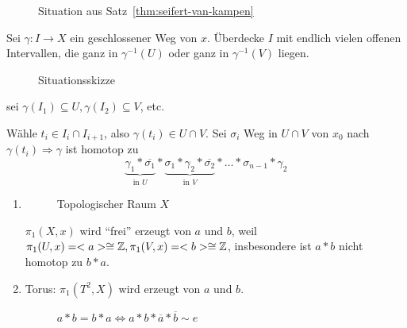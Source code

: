 \begin{figure}
    \centering
    
    \caption{Situation aus Satz~\ref{thm:seifert-van-kampen}}
    \label{fig:satz-seifert-van-kampen}
\end{figure}

\begin{beweis}
    Sei $\gamma: I \rightarrow X$ ein geschlossener Weg von $x$.
    Überdecke $I$ mit endlich vielen offenen Intervallen, die ganz in 
    $\gamma^{-1}(U)$ oder ganz in $\gamma^{-1}(V)$ liegen.

    \begin{figure}
        \centering
        
        \caption{Situationsskizze}
        \label{fig:intervalle-auf-01}
    \end{figure}

    \Obda sei $\gamma(I_1) \subseteq U, \gamma(I_2) \subseteq V$, etc.

    Wähle $t_i \in I_i \cap I_{i+1}$, also $\gamma(t_i) \in U \cap V$.
    Sei $\sigma_i$ Weg in $U \cap V$ von $x_0$ nach $\gamma(t_i) \Rightarrow \gamma$
    ist homotop zu 
    \[\underbrace{\gamma_1 * \overline{\sigma_1}}_{\text{in } U} * \underbrace{\sigma_1 * \gamma_2 * \overline{\sigma_2}}_{\text{in } V} * \dots * \sigma_{n-1} * \gamma_2\]
\end{beweis}

\begin{beispiel}
    \begin{enumerate}[label=\arabic*)]
        \item
            \begin{figure}
                \centering
                
                \caption{Topologischer Raum $X$}
                \label{fig:top-raum-kreise}
            \end{figure}

            $\pi_1(X,x)$ wird \enquote{frei} erzeugt von $a$ und $b$, weil
            $\pi_1(U,x) = <a> \cong \mathbb{Z}, \pi_1(V,x) = <b> \cong \mathbb{Z}$,
            insbesondere ist $a*b$ nicht homotop zu $b*a$.
        \item Torus: $\pi_1(T^2, X)$ wird erzeugt von $a$ und $b$.
            \begin{figure}
                \centering
                
                \caption{$a*b = b*a \Leftrightarrow a * b * \overline{a} * \overline{b} \sim e$}
                \label{fig:torous-a-b}
            \end{figure}
            \end{enumerate}
\end{beispiel}

